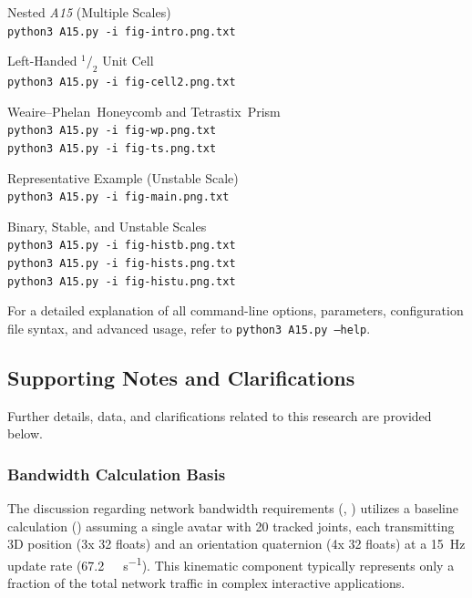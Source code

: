 \documentclass[10pt]{article}
\def\AAAB{\textit{A15}}
\def\WP{Weaire--Phelan}
\def\WPH{\WP{}~Honeycomb}
\def\TSP{Tetrastix~Prism}
\begin{document}
\begin{description} \itemsep0pt
    \item[\Cref{fig-intro} (Intro):] Nested \AAAB{} (Multiple Scales) \\
        \texttt{python3 A15.py -i fig-intro.png.txt}
    \item[\Cref{fig-cell2} (Internals):] Left-Handed $^1/_2$ Unit Cell \\
        \texttt{python3 A15.py -i fig-cell2.png.txt}
    \item[\Cref{fig-wp-ts} (Partitions):] \WPH{} and \TSP{} \\
        \texttt{python3 A15.py -i fig-wp.png.txt} \\
        \texttt{python3 A15.py -i fig-ts.png.txt}
    \item[\Cref{fig-main} (Composite):] Representative Example (Unstable Scale) \\
        \texttt{python3 A15.py -i fig-main.png.txt}
    \item[\Cref{fig-hist} (Histograms):] Binary, Stable, and Unstable Scales \\
        \texttt{python3 A15.py -i fig-histb.png.txt} \\
        \texttt{python3 A15.py -i fig-hists.png.txt} \\
        \texttt{python3 A15.py -i fig-histu.png.txt}
\end{description}
For a detailed explanation of all command-line options, parameters, configuration file syntax, and advanced usage, refer to \texttt{python3 A15.py --help}.

\subsection{Supporting Notes and Clarifications}\label{subsec-supplementary-notes}

Further details, data, and clarifications related to this research are provided below.

\subsubsection{Bandwidth Calculation Basis}\label{subsubsec-notes-bandwidth}
The discussion regarding network bandwidth requirements (, ) utilizes a baseline calculation () assuming a single avatar with 20 tracked joints, each transmitting 3D position (3x \SI{32}{\bit} floats) and an orientation quaternion (4x \SI{32}{\bit} floats) at a \SI{15}{\hertz} update rate (\approx \SI{67.2}{\kilo\bit\per\second}). This kinematic component typically represents only a fraction of the total network traffic in complex interactive applications.
\end{document}

